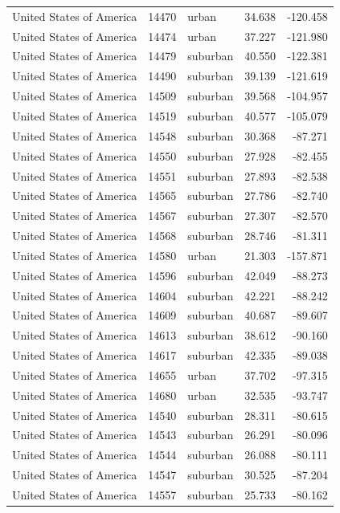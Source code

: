 \documentclass{article}
\begin{document}
\begin{longtable}{lllrr}
United States of America & 14470 & urban & 34.638 & -120.458 \\ 
United States of America & 14474 & urban & 37.227 & -121.980 \\ 
United States of America & 14479 & suburban & 40.550 & -122.381 \\ 
United States of America & 14490 & suburban & 39.139 & -121.619 \\ 
United States of America & 14509 & suburban & 39.568 & -104.957 \\ 
United States of America & 14519 & suburban & 40.577 & -105.079 \\ 
United States of America & 14548 & suburban & 30.368 & -87.271 \\ 
United States of America & 14550 & suburban & 27.928 & -82.455 \\ 
United States of America & 14551 & suburban & 27.893 & -82.538 \\ 
United States of America & 14565 & suburban & 27.786 & -82.740 \\ 
United States of America & 14567 & suburban & 27.307 & -82.570 \\ 
United States of America & 14568 & suburban & 28.746 & -81.311 \\ 
United States of America & 14580 & urban & 21.303 & -157.871 \\ 
United States of America & 14596 & suburban & 42.049 & -88.273 \\ 
United States of America & 14604 & suburban & 42.221 & -88.242 \\ 
United States of America & 14609 & suburban & 40.687 & -89.607 \\ 
United States of America & 14613 & suburban & 38.612 & -90.160 \\ 
United States of America & 14617 & suburban & 42.335 & -89.038 \\ 
United States of America & 14655 & urban & 37.702 & -97.315 \\ 
United States of America & 14680 & urban & 32.535 & -93.747 \\ 
United States of America & 14540 & suburban & 28.311 & -80.615 \\ 
United States of America & 14543 & suburban & 26.291 & -80.096 \\ 
United States of America & 14544 & suburban & 26.088 & -80.111 \\ 
United States of America & 14547 & suburban & 30.525 & -87.204 \\ 
United States of America & 14557 & suburban & 25.733 & -80.162 \\ 

\end{longtable}
\end{document}
